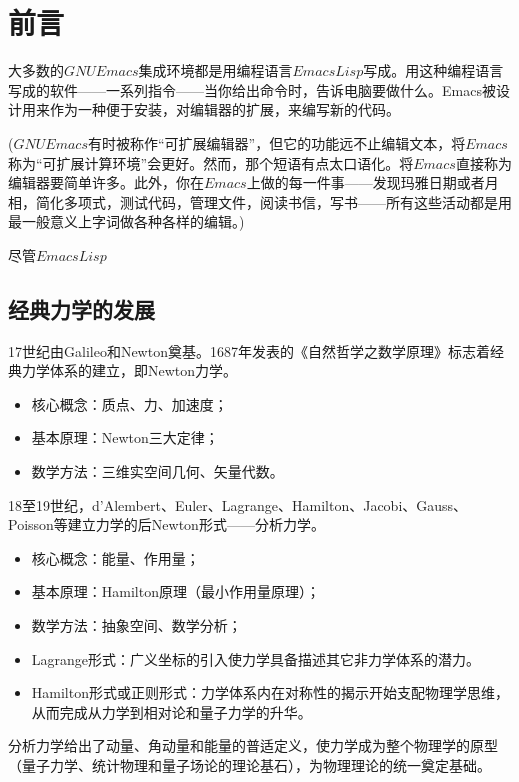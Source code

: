 
\setcounter{chapter}{-1}
\chapter{前言}
大多数的$GNU Emacs$集成环境都是用编程语言$Emacs Lisp$写成。用这种编程语言写成的软件——一系列指令——当你给出命令时，告诉电脑要做什么。Emacs被设计用来作为一种便于安装，对编辑器的扩展，来编写新的代码。\par 
($GNU Emacs$有时被称作“可扩展编辑器”，但它的功能远不止编辑文本，将$Emacs$称为“可扩展计算环境”会更好。然而，那个短语有点太口语化。将$Emacs$直接称为编辑器要简单许多。此外，你在$Emacs$上做的每一件事——发现玛雅日期或者月相，简化多项式，测试代码，管理文件，阅读书信，写书——所有这些活动都是用最一般意义上字词做各种各样的编辑。)\par
尽管$Emacs Lisp$




\section{经典力学的发展}

17世纪由Galileo和Newton奠基。1687年发表的《自然哲学之数学原理》标志着经典力学体系的建立，即Newton力学。
\begin{itemize}
    \item {\heiti 核心概念}：质点、力、加速度；
    \item {\heiti 基本原理}：Newton三大定律；
    \item {\heiti 数学方法}：三维实空间几何、矢量代数。
\end{itemize}

18至19世纪，d'Alembert、Euler、Lagrange、Hamilton、Jacobi、Gauss、Poisson等建立力学的后Newton形式——分析力学。
\begin{itemize}
    \item {\heiti 核心概念}：能量、作用量；
    \item {\heiti 基本原理}：Hamilton原理（最小作用量原理）；
    \item {\heiti 数学方法}：抽象空间、数学分析；
    \item {\heiti Lagrange形式}：广义坐标的引入使力学具备描述其它非力学体系的潜力。
    \item {\heiti Hamilton形式或正则形式}：力学体系内在对称性的揭示开始支配物理学思维，从而完成从力学到相对论和量子力学的升华。
\end{itemize}

分析力学给出了动量、角动量和能量的普适定义，使力学成为整个物理学的原型（量子力学、统计物理和量子场论的理论基石），为物理理论的统一奠定基础。

